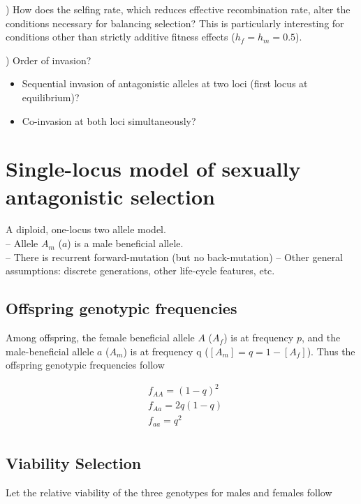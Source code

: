 \documentclass[11pt]{article}
\renewcommand\thesubsection{\arabic{subsection})}
\renewcommand\thesubsubsection{}
\begin{document}
) How does the selfing rate, which reduces effective recombination rate, alter the conditions necessary for balancing selection? This is particularly interesting for conditions other than strictly additive fitness effects ($h_f=h_m=0.5$). \bigskip

) Order of invasion? 
\begin{itemize}
  \item Sequential invasion of antagonistic alleles at two loci (first locus at equilibrium)?
  \item Co-invasion at both loci simultaneously?
\end{itemize}

\newpage{}






\renewcommand\thesubsection{\arabic{subsection})}
\renewcommand\thesubsubsection{}
\setcounter{subsection}{0}  %
\section{Single-locus model of sexually antagonistic selection}

A diploid, one-locus two allele model. \\
-- Allele $A_m$ ($a$) is a male beneficial allele. \\
-- There is recurrent forward-mutation (but no back-mutation)
-- Other general assumptions: discrete generations, other life-cycle features, etc. \bigskip

\subsection{Offspring genotypic frequencies}
Among offspring, the female beneficial allele $A$ ($A_f$) is at frequency $p$, and the male-beneficial allele $a$ ($A_m$) is at frequency q ($[A_m] = q = 1 - [A_f]$). Thus the offspring genotypic frequencies follow 

\begin{align*}
&f_{AA} = (1-q)^{2} \\
&f_{Aa} = 2q(1-q) \\
&f_{aa} = q^{2} \\
\end{align*}


\subsection{Viability Selection}
Let the relative viability of the three genotypes for males and females follow
\end{document}
